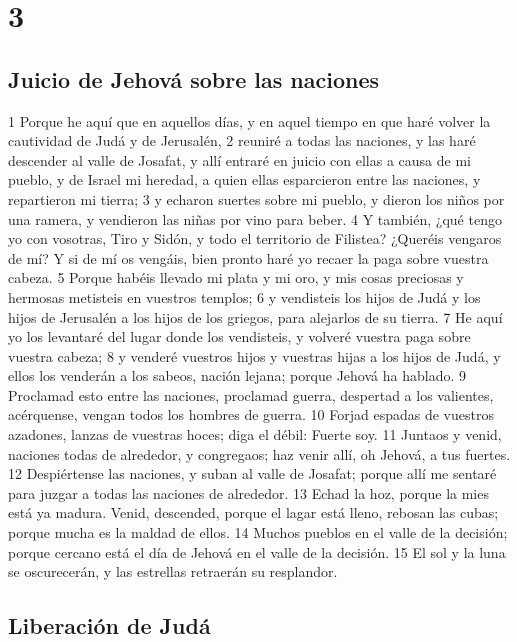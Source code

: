 \chapter{3}

\section*{Juicio de Jehová sobre las naciones}

1 Porque he aquí que en aquellos días, y en aquel tiempo en que haré volver la cautividad de Judá y de Jerusalén,
2 reuniré a todas las naciones, y las haré descender al valle de Josafat, y allí entraré en juicio con ellas a causa de mi pueblo, y de Israel mi heredad, a quien ellas esparcieron entre las naciones, y repartieron mi tierra;
3 y echaron suertes sobre mi pueblo, y dieron los niños por una ramera, y vendieron las niñas por vino para beber.
4 Y también, ¿qué tengo yo con vosotras, Tiro y Sidón, y todo el territorio de Filistea? ¿Queréis vengaros de mí? Y si de mí os vengáis, bien pronto haré yo recaer la paga sobre vuestra cabeza.
5 Porque habéis llevado mi plata y mi oro, y mis cosas preciosas y hermosas metisteis en vuestros templos;
6 y vendisteis los hijos de Judá y los hijos de Jerusalén a los hijos de los griegos, para alejarlos de su tierra.
7 He aquí yo los levantaré del lugar donde los vendisteis, y volveré vuestra paga sobre vuestra cabeza;
8 y venderé vuestros hijos y vuestras hijas a los hijos de Judá, y ellos los venderán a los sabeos, nación lejana; porque Jehová ha hablado.
9 Proclamad esto entre las naciones, proclamad guerra, despertad a los valientes, acérquense, vengan todos los hombres de guerra.
10 Forjad espadas de vuestros azadones, lanzas de vuestras hoces; diga el débil: Fuerte soy.
11 Juntaos y venid, naciones todas de alrededor, y congregaos; haz venir allí, oh Jehová, a tus fuertes.
12 Despiértense las naciones, y suban al valle de Josafat; porque allí me sentaré para juzgar a todas las naciones de alrededor.
13 Echad la hoz, porque la mies está ya madura. Venid, descended, porque el lagar está lleno, rebosan las cubas; porque mucha es la maldad de ellos.
14 Muchos pueblos en el valle de la decisión; porque cercano está el día de Jehová en el valle de la decisión.
15 El sol y la luna se oscurecerán, y las estrellas retraerán su resplandor.

\section*{Liberación de Judá}

